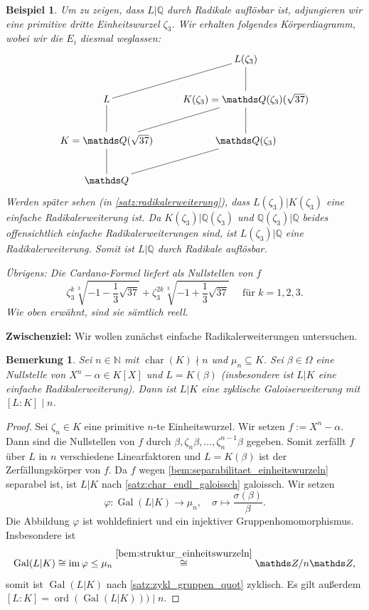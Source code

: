 \documentclass[a4paper, twoside, 11pt, ngerman]{report}
\newcommand{\NN}{\mathds N}
\newcommand{\QQ}{\mathds Q}
\newcommand{\ZZ}{\mathds Z}
\DeclareMathOperator{\charact}{char}
\DeclareMathOperator{\Gal}{Gal}
\DeclareMathOperator{\image}{im}
\DeclareMathOperator{\ord}{ord}
\theoremstyle{definistyle}
\newtheorem{bem}[satz]{Bemerkung}
\newtheorem{bsp}[satz]{Beispiel}
\theoremstyle{remark}
\begin{document}
\begin{bsp}
Um zu zeigen, dass $L|\QQ$ durch Radikale auflösbar ist, adjungieren wir eine primitive dritte Einheitswurzel $\zeta_3$. Wir erhalten folgendes Körperdiagramm, wobei wir die $E_i$ diesmal weglassen:
\[
\xymatrix{
    & L(\zeta_3) \ar@{-}[dl]  \ar@{-}[d]\\
    L \ar@{-}[d] & K(\zeta_3)=\QQ(\zeta_3)(\sqrt{37}) \ar@{-}[dl] \ar@{-}[d] \\
    K=\QQ(\sqrt{37}) \ar@{-}[d] & \QQ(\zeta_3) \ar@{-}[dl] \\
    \QQ &
}
\]
Werden später sehen (in \ref{satz:radikalerweiterung}), dass $L(\zeta_3) | K(\zeta_3)$ eine einfache Radikalerweiterung
ist. Da $K(\zeta_3)|\QQ(\zeta_3)$ und $\QQ(\zeta_3)|\QQ$ beides offensichtlich einfache Radikalerweiterungen sind, ist $L(\zeta_3) | \QQ$ eine Radikalerweiterung. Somit ist $L | \QQ$ durch Radikale auflösbar.

Übrigens: Die Cardano-Formel liefert als Nullstellen von $f$
\[
\zeta_3^k \sqrt[3]{-1 - \frac{1}{3} \sqrt{37}} + \zeta_3^{2k} \sqrt[3]{-1 + \frac{1}{3} \sqrt{37}} \quad \text{ für }k=1,2,3.
\]
Wie oben erwähnt, sind sie sämtlich reell.
\end{bsp}

\textbf{Zwischenziel:} Wir wollen zunächst einfache Radikalerweiterungen untersuchen.

\begin{bem}\label{bem:radikalerw_zyklisch}
Sei $ n \in \NN $ mit $\charact(K) \nmid n$ und $\mu_n \subseteq K$. Sei $\beta \in \Omega$ eine Nullstelle von $ X^n - \alpha \in K[X] $ und $ L = K(\beta) $ (insbesondere ist $ L | K $ eine einfache Radikalerweiterung). 
Dann ist $ L | K $ eine zyklische Galoiserweiterung mit $[L : K] \mid n$.
\end{bem}
\begin{proof}
Sei $\zeta_n \in K$ eine primitive $n$-te Einheitswurzel. Wir
setzen $f := X^n - \alpha$. Dann sind die Nullstellen von $f$ durch $\beta, \zeta_n \beta, \dots, \zeta_n^{n-1} \beta$ gegeben. Somit zerfällt $f$ über $L$ in $n$ verschiedene Linearfaktoren und $L = K(\beta)$ ist der Zerfällungskörper von $f$.
Da $f$ wegen \ref{bem:separabilitaet_einheitswurzeln} separabel ist, ist $L|K$
nach \ref{satz:char_endl_galoissch} galoissch.
Wir setzen
\[
\varphi \colon \Gal(L | K) \to \mu_n, \quad \sigma \mapsto \frac{\sigma(\beta)}{\beta}.
\]
Die Abbildung $\varphi$ ist wohldefiniert und ein injektiver Gruppenhomomorphismus.
Insbesondere ist 
\[\Gal(L | K) \cong \image \varphi \leq \mu_n \overset{\ref{bem:struktur_einheitswurzeln}}{\cong} \ZZ / n \ZZ,\]
somit ist $\Gal(L | K)$ nach \ref{satz:zykl_gruppen_quot} zyklisch. Es gilt außerdem $[L : K] = \ord(\Gal(L | K))) \mid n$.
\end{proof}
\end{document}
